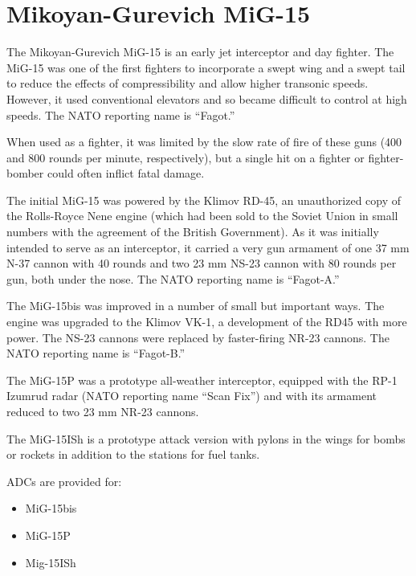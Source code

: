 \chapter*{Mikoyan-Gurevich MiG-15}

The Mikoyan-Gurevich MiG-15 is an early jet interceptor and day fighter. The MiG-15 was one of the first fighters to incorporate a swept wing and a swept tail to reduce the effects of compressibility and allow higher transonic speeds. However, it used conventional elevators and so became difficult to control at high speeds. The NATO reporting name is “Fagot.”

When used as a fighter, it was limited by the slow rate of fire of these guns (400 and 800 rounds per minute, respectively), but a single hit on a fighter or fighter-bomber could often inflict fatal damage.

The initial MiG-15 was powered by the Klimov RD-45, an unauthorized copy of the Rolls-Royce Nene engine (which had been sold to the Soviet Union in small numbers with the agreement of the British Government). As it was initially intended to serve as an interceptor, it carried a very gun armament of one 37 mm N-37 cannon with 40 rounds and two 23 mm NS-23 cannon with 80 rounds per gun, both under the nose. The NATO reporting name is “Fagot-A.”

The MiG-15bis was improved in a number of small but important ways. The engine was upgraded to the Klimov VK-1, a development of the RD45 with more power. The NS-23 cannons were replaced by faster-firing NR-23 cannons. The NATO reporting name is “Fagot-B.”

The MiG-15P was a prototype all-weather interceptor, equipped with the RP-1 Izumrud radar (NATO reporting name “Scan Fix”) and with its armament reduced to two 23 mm NR-23 cannons.

The MiG-15ISh is a prototype attack version with pylons in the wings for bombs or rockets in addition to the stations for fuel tanks.

ADCs are provided for:
\begin{itemize}
    \item MiG-15bis
    \item MiG-15P
    \item Mig-15ISh
\end{itemize}
